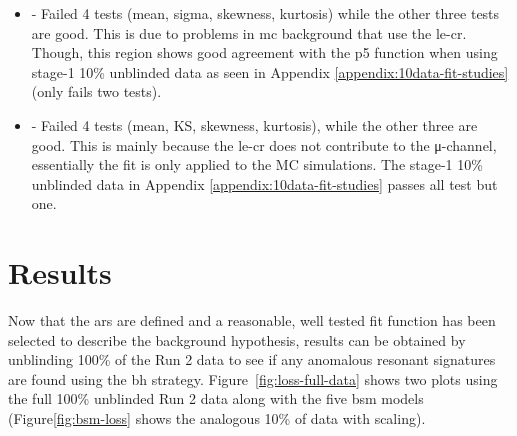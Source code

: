 \begin{itemize}
    \item \mbb - Failed 4 tests (mean, sigma, skewness, kurtosis) while the other three tests are good. This is due to problems in \gls{mc} background that use the \gls{le-cr}.
    Though, this region shows good agreement with the p5 function when using stage-1 10\% unblinded data as seen in Appendix \ref{appendix:10data-fit-studies} (only fails two tests).
    \item \mjmu - Failed 4 tests (mean, KS, skewness, kurtosis), while the other three are good. This is mainly because the \gls{le-cr} does not contribute to the μ-channel, 
    essentially the fit is only applied to the MC simulations. The stage-1 10\% unblinded data in Appendix \ref{appendix:10data-fit-studies} passes all test but one. 
\end{itemize}

\newpage

\section{Results}

Now that the \gls{ar}s are defined and a reasonable, well tested fit function has been selected to describe the background hypothesis, results can be obtained by unblinding 
100\% of the Run 2 data to see if any anomalous resonant signatures are found using the \gls{bh} strategy. Figure~\ref{fig:loss-full-data} shows two plots using the full 100\% unblinded Run 2 data 
along with the five \gls{bsm} models (Figure\ref{fig:bsm-loss} shows the analogous 10\% of data with scaling). 

